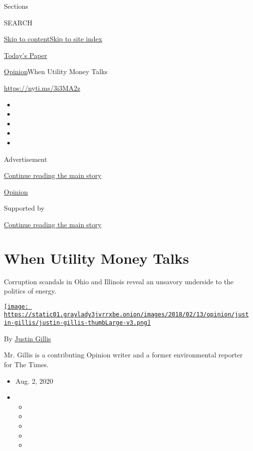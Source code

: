 Sections

SEARCH

\protect\hyperlink{site-content}{Skip to
content}\protect\hyperlink{site-index}{Skip to site index}

\href{https://myaccount.nytimes3xbfgragh.onion/auth/login?response_type=cookie\&client_id=vi}{}

\href{https://www.nytimes3xbfgragh.onion/section/todayspaper}{Today's
Paper}

\href{/section/opinion}{Opinion}\textbar{}When Utility Money Talks

\url{https://nyti.ms/3i3MA2z}

\begin{itemize}
\item
\item
\item
\item
\item
\end{itemize}

Advertisement

\protect\hyperlink{after-top}{Continue reading the main story}

\href{/section/opinion}{Opinion}

Supported by

\protect\hyperlink{after-sponsor}{Continue reading the main story}

\hypertarget{when-utility-money-talks}{%
\section{When Utility Money Talks}\label{when-utility-money-talks}}

Corruption scandals in Ohio and Illinois reveal an unsavory underside to
the politics of energy.

\href{https://www.nytimes3xbfgragh.onion/by/justin-gillis}{\texttt{[image: https://static01.graylady3jvrrxbe.onion/images/2018/02/13/opinion/justin-gillis/justin-gillis-thumbLarge-v3.png]}}

By \href{https://www.nytimes3xbfgragh.onion/by/justin-gillis}{Justin
Gillis}

Mr. Gillis is a contributing Opinion writer and a former environmental
reporter for The Times.

\begin{itemize}
\item
  Aug. 2, 2020
\item
  \begin{itemize}
  \item
  \item
  \item
  \item
  \item
  \end{itemize}
\end{itemize}

